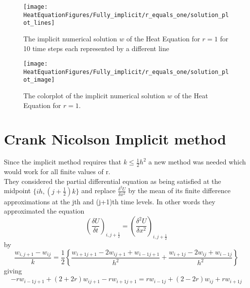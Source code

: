 \begin{example}
\begin{figure}[H]
  \caption{The implicit numerical solution $w$ of the Heat Equation for $r=1$ for 10 time steps each represented by a different line}
  \centering
    \texttt{[image: HeatEquationFigures/Fully\_implicit/r\_equals\_one/solution\_plot\_lines]}
\end{figure}


\begin{figure}[H]
  \caption{The colorplot of the implicit numerical solution $w$ of the Heat Equation for $r=1$.}
  \centering
    \texttt{[image: HeatEquationFigures/Fully\_implicit/r\_equals\_one/solution\_plot\_image]}
\end{figure}
\end{example}


\section{Crank Nicolson Implicit method}
Since the implicit method requires that $k\leq \frac{1}{2}h^2$ a new method was
needed which would work for all finite values of r.\\
They considered the partial differential equation as being satisfied at the
midpoint $\{ih,(j+\frac{1}{2})k \}$ and replace $\frac{\delta^2 U}{\delta x^2}$ by the
mean of its finite difference approximations at the jth and (j+1)th time levels.
In other words they approximated the equation
\[ \left(\frac{\delta U}{\delta t}\right)_{i,j+\frac{1}{2}}
= 
 \left(\frac{\delta^2 U}{\delta x^2}\right)_{i,j+\frac{1}{2}}\]
by
\[\frac{w_{i,j+1}-w_{ij}}{k}=\frac{1}{2}\left\{\frac{w_{i+1j+1}-2w_{ij+1}+w_{i-1j+1}}{h^2}+
\frac{w_{i+1j}-2w_{ij}+w_{i-1j}}{h^2}
\right\}
\]
giving
\begin{equation}
\label{2 crank}
-rw_{i-1j+1}+(2+2r)w_{ij+1}-rw_{i+1j+1}
=
rw_{i-1j}+(2-2r)w_{ij}+rw_{i+1j}
\end{equation}

